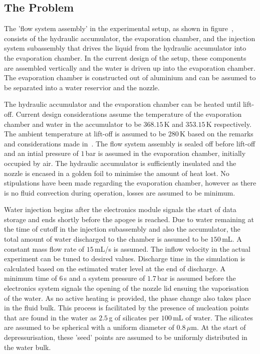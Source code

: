 \subsection{The Problem} 
The 'flow system assembly' in the experimental setup, as shown in figure~, 
 consists of the hydraulic accumulator, 
 the evaporation chamber, and the injection 
 system subassembly that drives the liquid from the hydraulic 
 accumulator into the evaporation chamber. In the current 
 design of the setup, these components are assembled vertically and the 
 water is driven up into the evaporation chamber. The evaporation chamber is constructed 
 out of aluminium and can 
 be assumed to be separated into a water reservior and the nozzle.~

The hydraulic accumulator and the evaporation chamber can be heated until lift-off. Current design considerations 
 assume the temperature of the evaporation chamber and water in the accumulator to be $368.15$\,K and $353.15$\,K respectively. 
 The ambient temperature at lift-off is assumed to be $280$\,K based on the remarks and considerations made in~.
 The flow system assembly is sealed off before lift-off and an intial pressure of $1$\,bar is assumed in the evaporation chamber, initially 
 occupied by air. The hydraulic accumulator is sufficiently insulated and the nozzle is encased in a golden foil to minimise the amount of 
 heat lost. No stipulations have been made regarding the evaporation chamber, however as there is no fluid convection
 during operation, losses are assumed to be minimum. 

Water injection begins after the electronics module signals the start of data storage and ends shortly before the apogee is reached. 
 Due to water remaining at the time of cutoff in the injection subassembly and also the accumulator, the total amount of water discharged to 
 the chamber is assumed to be $150$\,mL. A constant mass flow rate of $15$\,mL/s is assumed. The inflow velocity in the actual experiment can be tuned to 
 desired values. Discharge time in the simulation is calculated based on the estimated water level at the end of discharge.
 A minimum time of $6$\,s and a system pressure
 of $1.7$\,bar is assumed before the electronics system signals the opening of the nozzle lid ensuing the vaporisation of the water.
 As no active heating is provided, the phase change also takes place in the fluid bulk. This process is facilitated by the presence 
 of nucleation points that are found in the water as $2.5$\,g of silicates per $100$\,mL of water. The silicates are assumed to be spherical 
 with a uniform diameter of $0.8\,\mu$m. At the start of depressurisation, these 'seed' points are assumed to be uniformly
 distributed in the water bulk.

